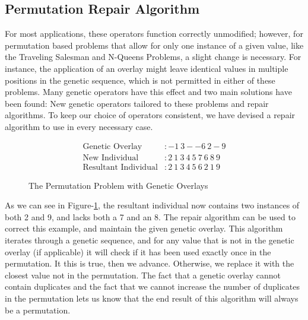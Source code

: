 \subsection*{Permutation Repair Algorithm}
For most applications, these operators function correctly unmodified; however, for permutation based problems that allow for only one instance of a given value, like the Traveling Salesman and N-Queens Problems, a slight change is necessary. For instance, the application of an overlay might leave identical values in multiple positions in the genetic sequence, which is not permitted in either of these problems. Many genetic operators have this effect and two main solutions have been found: New genetic operators tailored to these problems and repair algorithms\cite{Larranaga99}. To keep our choice of operators consistent, we have devised a repair algorithm to use in every necessary case.
\begin{figure}[h!]
\centering 
\begin{align*}
\text{Genetic Overlay} &:   -1~3--6~2-9				\\
\text{New Individual} &: 2~1~3~4~5~7~6~8~9			\\		
\text{Resultant Individual} &: 2~1~3~4~5~6~2~1~9
\end{align*}
\caption{The Permutation Problem with Genetic Overlays}
\label{PRA-Fig}
\end{figure}

As we can see in Figure-\ref{PRA-Fig}, the resultant individual now contains two instances of both 2 and 9, and lacks both a 7 and an 8. The repair algorithm can be used to correct this example, and maintain the given genetic overlay. This algorithm iterates through a genetic sequence, and for any value that is not in the genetic overlay (if applicable) it will check if it has been used exactly once in the permutation. It this is true, then we advance. Otherwise, we replace it with the closest value not in the permutation. The fact that a genetic overlay cannot contain duplicates and the fact that we cannot increase the number of duplicates in the permutation lets us know that the end result of this algorithm will always be a permutation. 